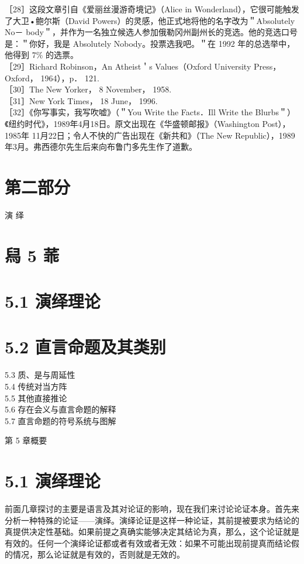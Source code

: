 ［28］这段文章引自《爱丽丝漫游奇境记》（Alice in Wonderland），它很可能触发了大卫•鲍尔斯（David Powers）的灵感，他正式地将他的名字改为＂Absolutely No－ body＂，并作为一名独立候选人参加俄勒冈州副州长的竞选。他的竞选口号是：＂你好，我是 Absolutely Nobody。投票选我吧。＂在 1992 年的总选举中，他得到 $7 \%$ 的选票。\\
［29］Richard Robinson，An Atheist＇s Values（Oxford University Press，Oxford， 1964），p． 121.\\
［30］The New Yorker， 8 November， 1958.\\
［31］New York Times， 18 June， 1996.\\
［32］《你写事实，我写吹嘘》（＂You Write the Facts．Ill Write the Blurbs＂）《纽约时代》，1989年4月18日。原文出现在《华盛顿邮报》（Washington Post），1985年 11月22日；令人不快的广告出现在《新共和》（The New Republic），1989年3月。弗西德尔先生后来向布鲁门多先生作了道歉。

\section*{第二部分}
演 绎

\section*{舄 5 䓙}
\section*{5.1 演绎理论}
\section*{5.2 直言命题及其类别}
5.3 质、是与周延性\\
5.4 传统对当方阵\\
5.5 其他直接推论\\
5.6 存在会义与直言命题的解释\\
5.7 直言命题的符号系统与图解

第 5 章概要

\section*{5.1 演绎理论}
前面几章探讨的主要是语言及其对论证的影响，现在我们来讨论论证本身。首先来分析一种特殊的论证——演绎。演绎论证是这样一种论证，其前提被要求为结论的真提供决定性基础。如果前提之真确实能够决定其结论为真，那么，这个论证就是有效的。任何一个演绎论证都或者有效或者无效：如果不可能出现前提真而结论假的情况，那么论证就是有效的，否则就是无效的。

